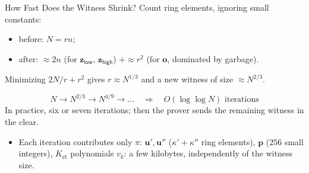 \documentclass{zkdl-presentation-template}
\begin{document}
    \begin{frame}{How Fast Does the Witness Shrink?}
        Count ring elements, ignoring small constants:
        \begin{itemize}
            \item before: $N = rn$;
            \item after: $\approx 2n$ (for $\mathbf{z}_{\mathsf{low}}$, $\mathbf{z}_{\mathsf{high}}$) $+ \approx r^2$ (for $\mathbf{o}$, dominated by garbage).
        \end{itemize}
        \pause
        Minimizing $2N/r + r^2$ gives $r \approx N^{1/3}$ and a new witness of size $\approx N^{2/3}$.
        \pause

        \begin{equation*}
            N \to N^{2/3} \to N^{4/9} \to \dots \quad \Rightarrow \quad O(\log \log N) \text{ iterations}
        \end{equation*}
        In practice, six or seven iterations; then the prover sends the remaining witness in the clear.
        \pause

        \begin{itemize}
            \item Each iteration contributes only $\pi$: $\mathbf{u}', \mathbf{u}''$ ($\kappa' + \kappa''$ ring elements), $\mathbf{p}$ ($256$ small integers), $K_{\mathsf{ct}}$ polynomials $v_k$: a few kilobytes, independently of the witness size.
        \end{itemize}

    \end{frame}
\end{document}
